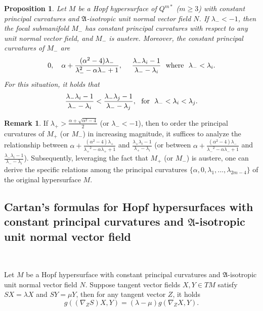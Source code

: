 \documentclass[reqno]{amsart}%
\newtheorem{proposition}[theorem]{Proposition}
\theoremstyle{definition}
\newtheorem{remark}{Remark}[section]
\numberwithin{equation}{section}
\begin{document}
\begin{proposition}\label{prop:4.4w}
Let $M$ be a Hopf hypersurface of $Q^{m*}$ ($m\geq3$) with constant principal curvatures and $\mathfrak{A}$-isotropic unit normal vector field $N$. If $\lambda_-<-1$, then the focal submanifold $M_-$ has constant principal curvatures with respect to any unit normal vector field, and $M_-$ is austere.
Moreover, the constant principal curvatures of $M_-$ are
$$
0,\ \ \ \alpha+\frac{(\alpha^2-4){\lambda_-}}{\lambda_-^2-\alpha{\lambda_-}+1}, \ \ \ \ \frac{{\lambda_-}\lambda_i-1}{{\lambda_-}-\lambda_i}\ \  {\rm where}\ \  {\lambda_-}<\lambda_i.
$$
For this situation, it holds that
$$
\frac{{\lambda_-}\lambda_i-1}{{\lambda_-}-\lambda_i}
<\frac{{\lambda_-}\lambda_j-1}{{\lambda_-}-\lambda_j},
\ \ {\rm for}\ \ {\lambda_-}<\lambda_i<\lambda_j.
$$
\end{proposition}

\begin{remark}\label{rem:4.1aa}
If $\lambda_+>\frac{\alpha+\sqrt{\alpha^2-4}}{2}$ (or $\lambda_-<-1$), then to order the principal curvatures of $M_+$ (or $M_-$) in increasing magnitude, it suffices to analyze the relationship between $\alpha+\frac{(\alpha^2-4){\lambda_+}}{{\lambda_+}^2-\alpha{\lambda_+}+1}$ and $\frac{{\lambda_+}\lambda_i-1}{{\lambda_+}-\lambda_i}$ (or between $\alpha+\frac{(\alpha^2-4){\lambda_-}}{{\lambda_-}^2-\alpha{\lambda_-}+1}$ and $\frac{{\lambda_-}\lambda_i-1}{{\lambda_-}-\lambda_i}$). Subsequently, leveraging the fact that $M_+$ (or $M_-$) is austere, one can derive the specific relations among the principal curvatures $\{\alpha,0,\lambda_1,...,\lambda_{2m-4}\}$ of the original hypersurface $M$. 
\end{remark}



\subsection{Cartan's formulas for Hopf hypersurfaces with constant principal curvatures and $\mathfrak{A}$-isotropic unit normal vector field}\label{sect:4.2}~

Let $M$ be a Hopf hypersurface with constant principal curvatures and $\mathfrak{A}$-isotropic unit normal vector field $N$.
Suppose tangent vector fields $X,Y\in TM$ satisfy $SX=\lambda X$ and $SY=\mu Y$,
then for any tangent vector $Z$, it holds
$$
g((\nabla_Z S)X,Y)=(\lambda-\mu)g(\nabla_Z X,Y).
$$
\end{document}
